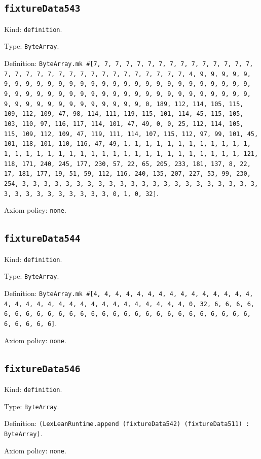 \documentclass[11pt]{article}
\begin{document}
\subsection*{\texttt{fixtureData543}}
\noindent Kind: \texttt{definition}.\par
\noindent Type: \texttt{ByteArray}.\par
\noindent Definition: \texttt{ByteArray.mk \#[7, 7, 7, 7, 7, 7, 7, 7, 7, 7, 7, 7, 7, 7, 7, 7, 7, 7, 7, 7, 7, 7, 7, 7, 7, 7, 7, 7, 7, 7, 7, 7, 4, 9, 9, 9, 9, 9, 9, 9, 9, 9, 9, 9, 9, 9, 9, 9, 9, 9, 9, 9, 9, 9, 9, 9, 9, 9, 9, 9, 9, 9, 9, 9, 9, 9, 9, 9, 9, 9, 9, 9, 9, 9, 9, 9, 9, 9, 9, 9, 9, 9, 9, 9, 9, 9, 9, 9, 9, 9, 9, 9, 9, 9, 9, 9, 9, 0, 189, 112, 114, 105, 115, 109, 112, 109, 47, 98, 114, 111, 119, 115, 101, 114, 45, 115, 105, 103, 110, 97, 116, 117, 114, 101, 47, 49, 0, 0, 25, 112, 114, 105, 115, 109, 112, 109, 47, 119, 111, 114, 107, 115, 112, 97, 99, 101, 45, 101, 118, 101, 110, 116, 47, 49, 1, 1, 1, 1, 1, 1, 1, 1, 1, 1, 1, 1, 1, 1, 1, 1, 1, 1, 1, 1, 1, 1, 1, 1, 1, 1, 1, 1, 1, 1, 1, 1, 1, 1, 121, 118, 171, 240, 245, 177, 230, 57, 22, 65, 205, 233, 181, 137, 8, 22, 17, 181, 177, 19, 51, 59, 112, 116, 240, 135, 207, 227, 53, 99, 230, 254, 3, 3, 3, 3, 3, 3, 3, 3, 3, 3, 3, 3, 3, 3, 3, 3, 3, 3, 3, 3, 3, 3, 3, 3, 3, 3, 3, 3, 3, 3, 3, 3, 0, 1, 0, 32]}.\par
\noindent Axiom policy: \texttt{none}.\par
\subsection*{\texttt{fixtureData544}}
\noindent Kind: \texttt{definition}.\par
\noindent Type: \texttt{ByteArray}.\par
\noindent Definition: \texttt{ByteArray.mk \#[4, 4, 4, 4, 4, 4, 4, 4, 4, 4, 4, 4, 4, 4, 4, 4, 4, 4, 4, 4, 4, 4, 4, 4, 4, 4, 4, 4, 4, 4, 4, 4, 0, 32, 6, 6, 6, 6, 6, 6, 6, 6, 6, 6, 6, 6, 6, 6, 6, 6, 6, 6, 6, 6, 6, 6, 6, 6, 6, 6, 6, 6, 6, 6, 6, 6]}.\par
\noindent Axiom policy: \texttt{none}.\par
\subsection*{\texttt{fixtureData546}}
\noindent Kind: \texttt{definition}.\par
\noindent Type: \texttt{ByteArray}.\par
\noindent Definition: \texttt{(LexLeanRuntime.append (fixtureData542) (fixtureData511) : ByteArray)}.\par
\noindent Axiom policy: \texttt{none}.\par
\end{document}
